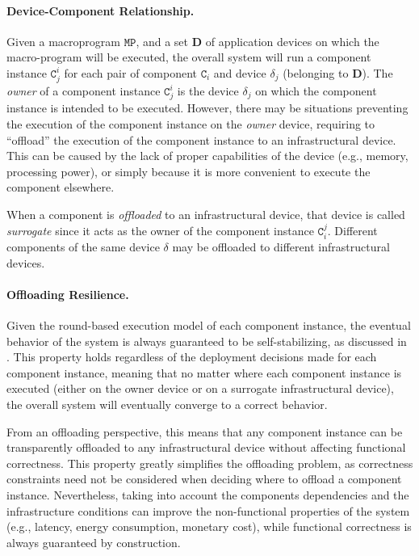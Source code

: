 \paragraph{Device-Component Relationship.}
Given a macroprogram $\mathtt{MP}$,
 and a set $\mathbf{D}$ of application devices on which the macro-program will be executed,
 the overall system will run a component instance $\mathtt{C}^i_j$
 for each pair of component $\mathtt{C}_i$ and device $\delta_j$ (belonging to $\mathbf{D}$).
%
The \emph{owner} of a component instance $\mathtt{C}^i_j$ is the device $\delta_j$
 on which the component instance is intended to be executed.
%
However,
 there may be situations preventing the execution of the component instance on the \emph{owner} device,
 requiring to ``offload'' the execution of the component instance to an infrastructural device.
%
This can be caused by the lack of proper capabilities of the device (e.g., memory, processing power),
 or simply because it is more convenient to execute the component elsewhere.

When a component is \emph{offloaded} to an infrastructural device,
 that device is called \emph{surrogate} since it acts as the owner of the component instance $\mathtt{C}_i^j$.
%
Different components of the same device $\delta$ may be offloaded to different infrastructural devices.

\paragraph{Offloading Resilience.}
Given the round-based execution model of each component instance,
 the eventual behavior of the system is always guaranteed to be self-stabilizing,
 as discussed in \cite{acsos-model}.
%
This property holds regardless of the deployment decisions made for each component instance,
 meaning that no matter where each component instance is executed (either on the owner device or on a surrogate infrastructural device),
 the overall system will eventually converge to a correct behavior.

From an offloading perspective,
 this means that any component instance can be transparently offloaded to any infrastructural device
 without affecting functional correctness.
%
This property greatly simplifies the offloading problem,
 as correctness constraints need not be considered when deciding where to offload a component instance.
%
Nevertheless,
 taking into account the components dependencies and the infrastructure conditions can improve the non-functional properties of the system
 (e.g., latency, energy consumption, monetary cost),
 while functional correctness is always guaranteed by construction.


